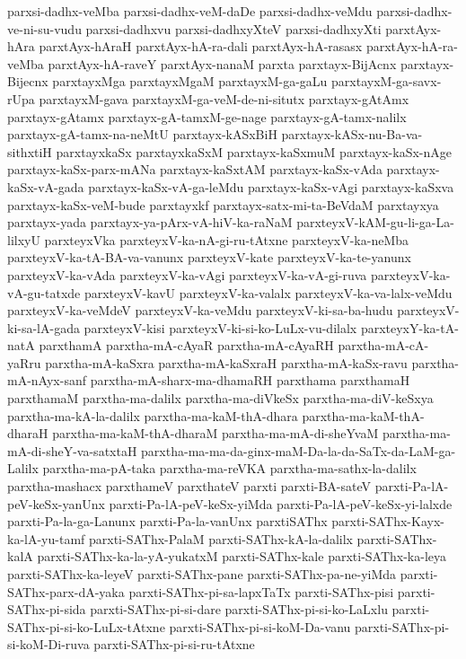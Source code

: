 {parxsi-dadhx-veMba
parxsi-dadhx-veM-daDe
parxsi-dadhx-veMdu
parxsi-dadhx-ve-ni-su-vudu
parxsi-dadhxvu
parxsi-dadhxyXteV
parxsi-dadhxyXti
parxtAyx-hAra
parxtAyx-hAraH
parxtAyx-hA-ra-dali
parxtAyx-hA-rasasx
parxtAyx-hA-ra-veMba
parxtAyx-hA-raveY
parxtAyx-nanaM
parxta
parxtayx-BijAcnx
parxtayx-Bijecnx
parxtayxMga
parxtayxMgaM
parxtayxM-ga-gaLu
parxtayxM-ga-savx-rUpa
parxtayxM-gava
parxtayxM-ga-veM-de-ni-situtx
parxtayx-gAtAmx
parxtayx-gAtamx
parxtayx-gA-tamxM-ge-nage
parxtayx-gA-tamx-nalilx
parxtayx-gA-tamx-na-neMtU
parxtayx-kASxBiH
parxtayx-kASx-nu-Ba-va-sithxtiH
parxtayxkaSx
parxtayxkaSxM
parxtayx-kaSxmuM
parxtayx-kaSx-nAge
parxtayx-kaSx-parx-mANa
parxtayx-kaSxtAM
parxtayx-kaSx-vAda
parxtayx-kaSx-vA-gada
parxtayx-kaSx-vA-ga-leMdu
parxtayx-kaSx-vAgi
parxtayx-kaSxva
parxtayx-kaSx-veM-bude
parxtayxkf
parxtayx-satx-mi-ta-BeVdaM
parxtayxya
parxtayx-yada
parxtayx-ya-pArx-vA-hiV-ka-raNaM
parxteyxV-kAM-gu-li-ga-La-lilxyU
parxteyxVka
parxteyxV-ka-nA-gi-ru-tAtxne
parxteyxV-ka-neMba
parxteyxV-ka-tA-BA-va-vanunx
parxteyxV-kate
parxteyxV-ka-te-yanunx
parxteyxV-ka-vAda
parxteyxV-ka-vAgi
parxteyxV-ka-vA-gi-ruva
parxteyxV-ka-vA-gu-tatxde
parxteyxV-kavU
parxteyxV-ka-valalx
parxteyxV-ka-va-lalx-veMdu
parxteyxV-ka-veMdeV
parxteyxV-ka-veMdu
parxteyxV-ki-sa-ba-hudu
parxteyxV-ki-sa-lA-gada
parxteyxV-kisi
parxteyxV-ki-si-ko-LuLx-vu-dilalx
parxteyxY-ka-tA-natA
parxthamA
parxtha-mA-cAyaR
parxtha-mA-cAyaRH
parxtha-mA-cA-yaRru
parxtha-mA-kaSxra
parxtha-mA-kaSxraH
parxtha-mA-kaSx-ravu
parxtha-mA-nAyx-sanf
parxtha-mA-sharx-ma-dhamaRH
parxthama
parxthamaH
parxthamaM
parxtha-ma-dalilx
parxtha-ma-diVkeSx
parxtha-ma-diV-keSxya
parxtha-ma-kA-la-dalilx
parxtha-ma-kaM-thA-dhara
parxtha-ma-kaM-thA-dharaH
parxtha-ma-kaM-thA-dharaM
parxtha-ma-mA-di-sheYvaM
parxtha-ma-mA-di-sheY-va-satxtaH
parxtha-ma-ma-da-ginx-maM-Da-la-da-SaTx-da-LaM-ga-Lalilx
parxtha-ma-pA-taka
parxtha-ma-reVKA
parxtha-ma-sathx-la-dalilx
parxtha-mashacx
parxthameV
parxthateV
parxti
parxti-BA-sateV
parxti-Pa-lA-peV-keSx-yanUnx
parxti-Pa-lA-peV-keSx-yiMda
parxti-Pa-lA-peV-keSx-yi-lalxde
parxti-Pa-la-ga-Lanunx
parxti-Pa-la-vanUnx
parxtiSAThx
parxti-SAThx-Kayx-ka-lA-yu-tamf
parxti-SAThx-PalaM
parxti-SAThx-kA-la-dalilx
parxti-SAThx-kalA
parxti-SAThx-ka-la-yA-yukatxM
parxti-SAThx-kale
parxti-SAThx-ka-leya
parxti-SAThx-ka-leyeV
parxti-SAThx-pane
parxti-SAThx-pa-ne-yiMda
parxti-SAThx-parx-dA-yaka
parxti-SAThx-pi-sa-lapxTaTx
parxti-SAThx-pisi
parxti-SAThx-pi-sida
parxti-SAThx-pi-si-dare
parxti-SAThx-pi-si-ko-LaLxlu
parxti-SAThx-pi-si-ko-LuLx-tAtxne
parxti-SAThx-pi-si-koM-Da-vanu
parxti-SAThx-pi-si-koM-Di-ruva
parxti-SAThx-pi-si-ru-tAtxne
}
